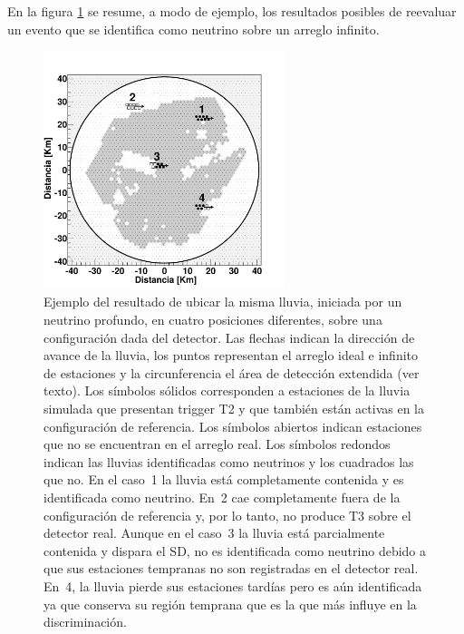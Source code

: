 	En la figura \ref{fig:aperturaReal} se resume, a modo de ejemplo, los resultados posibles de reevaluar un evento que se identifica como neutrino sobre un arreglo infinito.
	
	
	\begin{figure}[ht!]
		\begin{center}
			\includegraphics[width=0.63\textwidth]{fig/resultadosAuger/aperturaReal}
			\caption{Ejemplo del resultado de ubicar la misma lluvia, iniciada por un neutrino profundo, en cuatro posiciones diferentes, sobre una configuración dada del detector.
			Las flechas indican la dirección de avance de la lluvia, los puntos representan el arreglo ideal e infinito de estaciones y la circunferencia el área de detección extendida (ver texto).
			Los símbolos sólidos corresponden a estaciones de la lluvia simulada que presentan trigger T2 y que también están activas en la configuración de referencia.
			Los símbolos abiertos indican estaciones que no se encuentran en el arreglo real. Los símbolos redondos indican las lluvias identificadas como neutrinos y los cuadrados las que no.
			En el caso~1 la lluvia está completamente contenida y es identificada como neutrino. En~2 cae completamente fuera de la configuración de referencia y, por lo tanto, no produce T3 sobre el detector real.
			Aunque en el caso~3 la lluvia está parcialmente contenida y dispara el SD, no es identificada como neutrino debido a que sus estaciones tempranas no son registradas en el detector real. En~4, la lluvia pierde sus estaciones tardías pero es aún identificada ya que conserva su región temprana que es la que más influye en la discriminación.}
			\label{fig:aperturaReal}
		\end{center}
	\end{figure}
	
